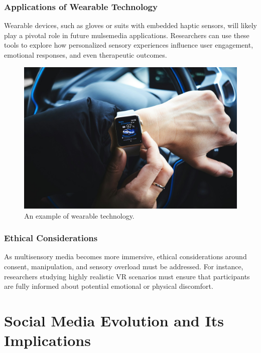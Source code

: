 \documentclass[
]{book}
\begin{document}
\subsubsection*{Applications of Wearable Technology}\label{applications-of-wearable-technology}

Wearable devices, such as gloves or suits with embedded haptic sensors, will likely play a pivotal role in future mulsemedia applications. Researchers can use these tools to explore how personalized sensory experiences influence user engagement, emotional responses, and even therapeutic outcomes.

\begin{figure}
\centering
\includegraphics[width=1\linewidth,height=\textheight,keepaspectratio]{images/wearable.jpg}
\caption{An example of wearable technology.}
\end{figure}

\subsubsection*{Ethical Considerations}\label{ethical-considerations}

As multisensory media becomes more immersive, ethical considerations around consent, manipulation, and sensory overload must be addressed. For instance, researchers studying highly realistic VR scenarios must ensure that participants are fully informed about potential emotional or physical discomfort.

\section{Social Media Evolution and Its Implications}\label{social-media-evolution-and-its-implications}
\end{document}
